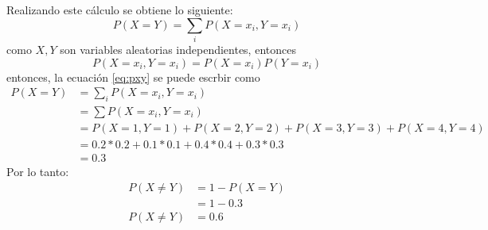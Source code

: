 \begin{itemize}
          Realizando este cálculo se obtiene lo siguiente:
          \begin{equation}
              P(X=Y) = \sum_i P(X=x_i,Y=x_i)
              \label{eq:pxy}
          \end{equation}
          como $X,Y$ son variables aleatorias independientes, entonces
          \begin{equation*}
              P(X=x_i,Y=x_i) = P(X=x_i)P(Y=x_i)
          \end{equation*}
          entonces, la ecuación \ref{eq:pxy} se puede escrbir como
          \begin{align*}
              P(X=Y) & = \sum_i P(X=x_i,Y=x_i)                      \\
                     & =\sum P(X=x_i,Y=x_i)                         \\
                     & =P(X=1,Y=1)+P(X=2,Y=2)+P(X=3,Y=3)+P(X=4,Y=4) \\
                     & = 0.2*0.2+0.1*0.1+0.4*0.4+0.3*0.3            \\
                     & = 0.3
          \end{align*}
          Por lo tanto:
          \begin{align*}
              P(X\neq Y) & = 1- P(X=Y) \\
                         & = 1-0.3     \\
              P(X\neq Y) & = 0.6
          \end{align*}
\end{itemize}